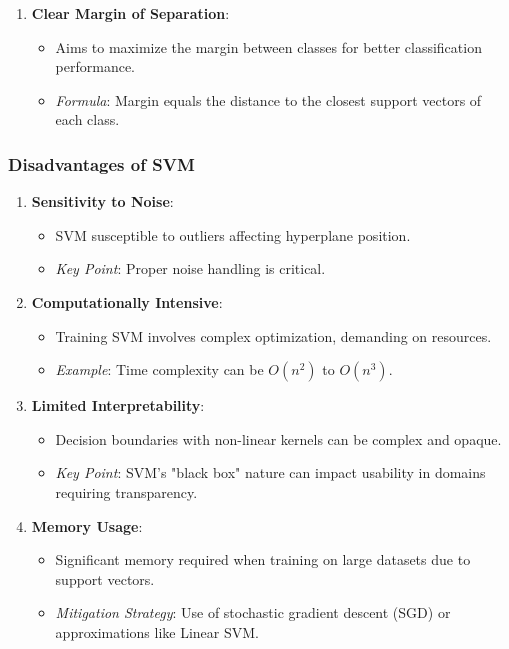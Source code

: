 \documentclass[aspectratio=169]{beamer}
\begin{document}
\begin{frame}[fragile]
\begin{enumerate}
        \item \textbf{Clear Margin of Separation}:
            \begin{itemize}
                \item Aims to maximize the margin between classes for better classification performance.
                \item \textit{Formula}: Margin equals the distance to the closest support vectors of each class.
            \end{itemize}
    \end{enumerate}
\end{frame}

\begin{frame}[fragile]
    \frametitle{Disadvantages of SVM}
    \begin{enumerate}
        \item \textbf{Sensitivity to Noise}:
            \begin{itemize}
                \item SVM susceptible to outliers affecting hyperplane position.
                \item \textit{Key Point}: Proper noise handling is critical.
            \end{itemize}
            
        \item \textbf{Computationally Intensive}:
            \begin{itemize}
                \item Training SVM involves complex optimization, demanding on resources.
                \item \textit{Example}: Time complexity can be \(O(n^2)\) to \(O(n^3)\).
            \end{itemize}

        \item \textbf{Limited Interpretability}:
            \begin{itemize}
                \item Decision boundaries with non-linear kernels can be complex and opaque.
                \item \textit{Key Point}: SVM's "black box" nature can impact usability in domains requiring transparency.
            \end{itemize}

        \item \textbf{Memory Usage}:
            \begin{itemize}
                \item Significant memory required when training on large datasets due to support vectors.
                \item \textit{Mitigation Strategy}: Use of stochastic gradient descent (SGD) or approximations like Linear SVM.
            \end{itemize}
    \end{enumerate}
\end{frame}
\end{document}
